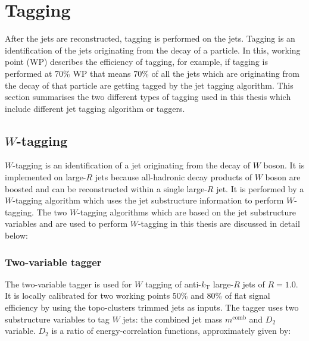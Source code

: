 \section{Tagging}
\label{sec:jetsandtaggers:taggers}
After the jets are reconstructed, tagging is performed on the jets. Tagging is an identification of the jets originating from the decay of a particle. In this, working point (WP) describes the efficiency of tagging, for example, if tagging is performed at 70\% WP that means 70\% of all the jets which are originating from the decay of that particle are getting tagged by the jet tagging algorithm. This section summarises the two different types of tagging used in this thesis which include different jet tagging algorithm or taggers.

\subsection{$W$-tagging}
\label{sec:jetsandtaggers:taggers:w}
$W$-tagging is an identification of a jet originating from the decay of $W$ boson. It is implemented on large-$R$ jets because all-hadronic decay products of $W$ boson are boosted and can be reconstructed within a single large-$R$ jet. It is performed by a $W$-tagging algorithm which uses the jet substructure information to perform $W$-tagging. The two $W$-tagging algorithms which are based on the jet substructure variables and are used to perform $W$-tagging in this thesis are discussed in detail below:~\cite{wtagger}

\subsubsection{Two-variable tagger}
\label{sec:jetsandtaggers:taggers:twovariable}
The two-variable tagger is used for $W$ tagging of anti-$k_{\text{T}}$ large-$R$ jets of $R=1.0$.~\cite{wtagger} It is locally calibrated for two working points 50\% and 80\% of flat signal efficiency by using the topo-clusters trimmed jets as inputs. The tagger uses two substructure variables to tag $W$ jets: the combined jet mass $m^{\text{comb}}$ and $D_{2}$ variable. $D_{2}$ is a ratio of energy-correlation functions, approximately given by:~\cite{d2}

